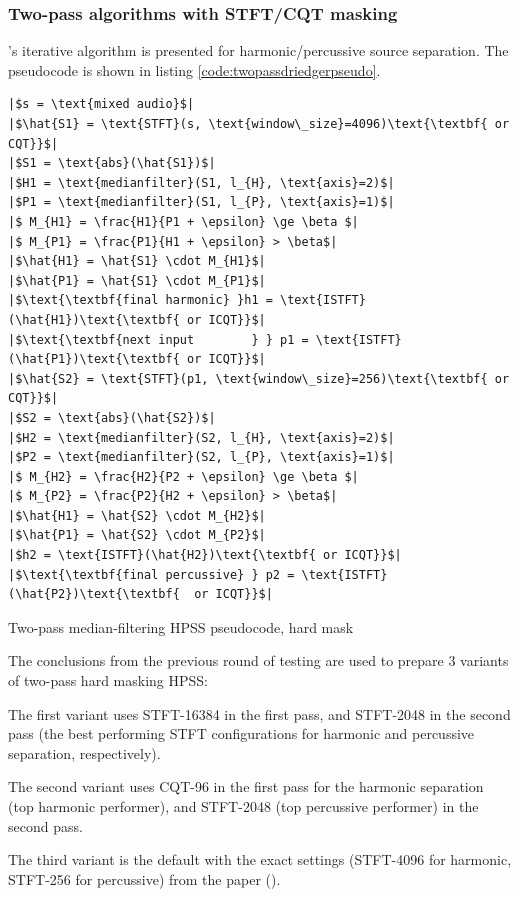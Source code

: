 \documentclass[10pt,letter]{article}
\newlength{\mintednumbersep}
\newenvironment{tight_enumerate}{
\begin{enumerate}
\setlength{\itemsep}{0pt}
\setlength{\parskip}{0pt}
}{\end{enumerate}}
\begin{document}
\subsubsection{Two-pass algorithms with STFT/CQT masking}

\citet{driedger}'s iterative algorithm is presented for harmonic/percussive source separation. The pseudocode is shown in listing \ref{code:twopassdriedgerpseudo}.

\begin{listing}[h]
\setlength\partopsep{-\topsep}
\begin{verbatim}
|$s = \text{mixed audio}$|
|$\hat{S1} = \text{STFT}(s, \text{window\_size}=4096)\text{\textbf{ or CQT}}$|
|$S1 = \text{abs}(\hat{S1})$|
|$H1 = \text{medianfilter}(S1, l_{H}, \text{axis}=2)$|
|$P1 = \text{medianfilter}(S1, l_{P}, \text{axis}=1)$|
|$ M_{H1} = \frac{H1}{P1 + \epsilon} \ge \beta $|
|$ M_{P1} = \frac{P1}{H1 + \epsilon} > \beta$|
|$\hat{H1} = \hat{S1} \cdot M_{H1}$|
|$\hat{P1} = \hat{S1} \cdot M_{P1}$|
|$\text{\textbf{final harmonic} }h1 = \text{ISTFT}(\hat{H1})\text{\textbf{ or ICQT}}$|
|$\text{\textbf{next input        } } p1 = \text{ISTFT}(\hat{P1})\text{\textbf{ or ICQT}}$|
|$\hat{S2} = \text{STFT}(p1, \text{window\_size}=256)\text{\textbf{ or CQT}}$|
|$S2 = \text{abs}(\hat{S2})$|
|$H2 = \text{medianfilter}(S2, l_{H}, \text{axis}=2)$|
|$P2 = \text{medianfilter}(S2, l_{P}, \text{axis}=1)$|
|$ M_{H2} = \frac{H2}{P2 + \epsilon} \ge \beta $|
|$ M_{P2} = \frac{P2}{H2 + \epsilon} > \beta$|
|$\hat{H1} = \hat{S2} \cdot M_{H2}$|
|$\hat{P1} = \hat{S2} \cdot M_{P2}$|
|$h2 = \text{ISTFT}(\hat{H2})\text{\textbf{ or ICQT}}$|
|$\text{\textbf{final percussive} } p2 = \text{ISTFT}(\hat{P2})\text{\textbf{  or ICQT}}$|
\end{verbatim}
\caption{Two-pass median-filtering HPSS pseudocode, hard mask}
\label{code:twopassdriedgerpseudo}
\end{listing}

The conclusions from the previous round of testing are used to prepare 3 variants of two-pass hard masking HPSS:
\begin{tight_enumerate}
	\vspace{-0.5em}
	\item
		The first variant uses STFT-16384 in the first pass, and STFT-2048 in the second pass (the best performing STFT configurations for harmonic and percussive separation, respectively).
	\item
		The second variant uses CQT-96 in the first pass for the harmonic separation (top harmonic performer), and STFT-2048 (top percussive performer) in the second pass.
	\item
		The third variant is the default with the exact settings (STFT-4096 for harmonic, STFT-256 for percussive) from the paper (\cite{driedger}).
\end{tight_enumerate}
\end{document}
